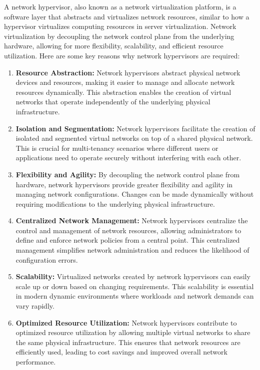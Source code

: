 \documentclass{report}
\begin{document}
A network hypervisor, also known as a network virtualization platform, is a software layer that abstracts and virtualizes network resources, similar to how a hypervisor virtualizes computing resources in server virtualization.
Network virtualization by decoupling the network control plane from the underlying hardware, allowing for more flexibility, scalability, and efficient resource utilization.\cite{1}
Here are some key reasons why network hypervisors are required\cite{2}:

\begin{enumerate}
  \item \textbf{Resource Abstraction:} Network hypervisors abstract physical network devices and resources, making it easier to manage and allocate network resources dynamically.
   This abstraction enables the creation of virtual networks that operate independently of the underlying physical infrastructure.

  \item \textbf{Isolation and Segmentation:} Network hypervisors facilitate the creation of isolated and segmented virtual networks on top of a shared physical network.
   This is crucial for multi-tenancy scenarios where different users or applications need to operate securely without interfering with each other.

  \item \textbf{Flexibility and Agility:} By decoupling the network control plane from hardware, network hypervisors provide greater flexibility and agility in managing network configurations.
  Changes can be made dynamically without requiring modifications to the underlying physical infrastructure.

  \item \textbf{Centralized Network Management:} Network hypervisors centralize the control and management of network resources, allowing administrators to define and enforce network policies from a central point.
  This centralized management simplifies network administration and reduces the likelihood of configuration errors.

  \item \textbf{Scalability:} Virtualized networks created by network hypervisors can easily scale up or down based on changing requirements.
  This scalability is essential in modern dynamic environments where workloads and network demands can vary rapidly.

  \item \textbf{Optimized Resource Utilization:} Network hypervisors contribute to optimized resource utilization by allowing multiple virtual networks to share the same physical infrastructure.
  This ensures that network resources are efficiently used, leading to cost savings and improved overall network performance.

\end{enumerate}
\end{document}
